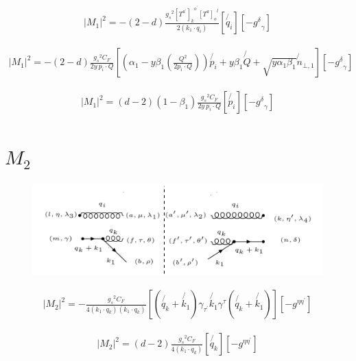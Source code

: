 \begin{equation}
\begin{split}
|M_1|^2=-(2-d)\frac{{g_s}^2 {[T^{a^{\prime}}]_k}^{o^{\prime}} {[T^a]_{o}}^{l}}{2(k_1 \cdot q_i)}[\not{q_i}][-{g^{\delta}}_{\gamma}]
\end{split}
\end{equation}

\begin{equation}
\begin{split}
|M_1|^2=-(2-d)\frac{{g_s}^2 C_F}{2y\:p_i \cdot Q}
[(\alpha_1 -y\beta_1(\frac{Q^2}{2p_i \cdot Q})) \not{p_i} + y\beta_1\not{Q} + \sqrt{y\alpha_1\beta_1}\not{n}_{\bot,1}][-{g^{\delta}}_{\gamma}]
\end{split}
\end{equation}

\begin{equation}
\begin{split}
|M_1|^2=(d-2)(1-\beta_1)\frac{{g_s}^2 C_F}{2y \:p_i \cdot Q}
[  \not{p_i}][-{g^{\delta}}_{\gamma}]
\end{split}
\end{equation}

\pagebreak

\section{$ M_2 $}
\begin{figure}[ht!]
\centering
\includegraphics[scale=0.7]{images/GQ/M2Squer.png}
\end{figure}

\begin{equation}
\begin{split}
|M_2|^2=-\frac{{g_s}^2 C_F}{4(k_1 \cdot q_k)(k_1 \cdot q_k)}[(\not{q_k}+\not{k_1}) {\gamma}_{{\tau}^{\prime}}\not{k_1}{\gamma}^{\tau}(\not{q_k}+\not{k_1})][-g^{{\eta}{\eta}^{\prime}}]
\end{split}
\end{equation}

\begin{equation}
\begin{split}
|M_2|^2=(d-2)\frac{{g_s}^2 C_F}{4(k_1 \cdot q_k)}[\not{q_k}][-g^{{\eta}{\eta}^{\prime}}]
\end{split}
\end{equation}

